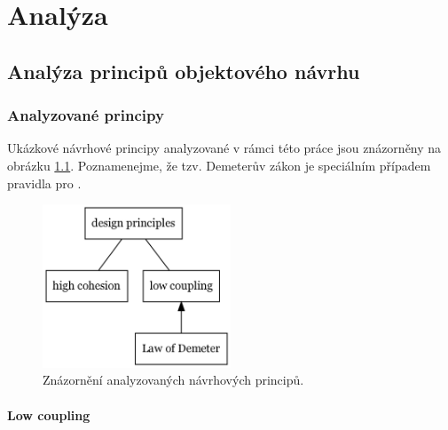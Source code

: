 \chapter{Analýza}


\section{Analýza principů objektového návrhu}


\subsection{Analyzované principy}
Ukázkové návrhové principy analyzované v rámci této práce jsou znázorněny na obrázku \ref{analyzed_principles}. Poznamenejme, že tzv. Demeterův zákon je speciálním případem pravidla pro .

\begin{figure}[h!]
\centering
\includegraphics[width=0.5\textwidth]{./graphs/oop_design_principles.png}
\caption{Znázornění analyzovaných návrhových principů.\label{analyzed_principles}}
\end{figure}



\subsubsection{Low coupling}

